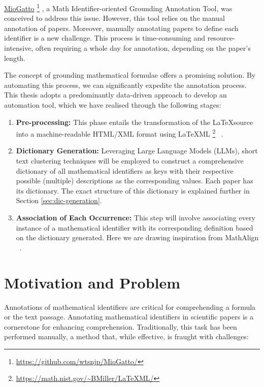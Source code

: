 \href{https://github.com/wtsnjp/MioGatto/tree/main}{MioGatto} \footnote{\url{https://github.com/wtsnjp/MioGatto/}} \citep{asakura2021miogatto}, a Math Identifier-oriented Grounding Annotation Tool, was conceived to address this issue. However, this tool relies on the manual annotation of papers. Moreover, manually annotating papers to define each identifier is a new challenge. This process is time-consuming and resource-intensive, often requiring a whole day for annotation, depending on the paper's length.

The concept of grounding mathematical formulae \citep{asakura2020towards} offers a promising solution. By automating this process, we can significantly expedite the annotation process. This thesis adopts a predominantly data-driven approach to develop an automation tool, which we have realised through the following stages:

\begin{enumerate}
    \item \textbf{Pre-processing:} This phase entails the transformation of the \LaTeX \space source into a machine-readable HTML/XML format using \LaTeX ML \footnote{\url{https://math.nist.gov/~BMiller/LaTeXML/}} ~\citep{ginev2011latexml}.
    
    \item \textbf{Dictionary Generation:} Leveraging Large Language Models (\ac{LLMs}), short text clustering techniques will be employed to construct a comprehensive dictionary of all mathematical identifiers as keys with their respective possible (multiple) descriptions as the corresponding values. Each paper has its dictionary. The exact structure of this dictionary is explained further in Section \ref{sec:dic-generation}.
    
    \item \textbf{Association of Each Occurrence:} This step will involve associating every instance of a mathematical identifier with its corresponding definition based on the dictionary generated. Here we are drawing inspiration from MathAlign ~\citep{alexeeva2020mathalign}.
\end{enumerate}


\section{Motivation and Problem}

Annotations of mathematical identifiers are critical for comprehending a formula or the text passage. Annotating mathematical identifiers in scientific papers is a cornerstone for enhancing comprehension. Traditionally, this task has been performed manually, a method that, while effective, is fraught with challenges:

